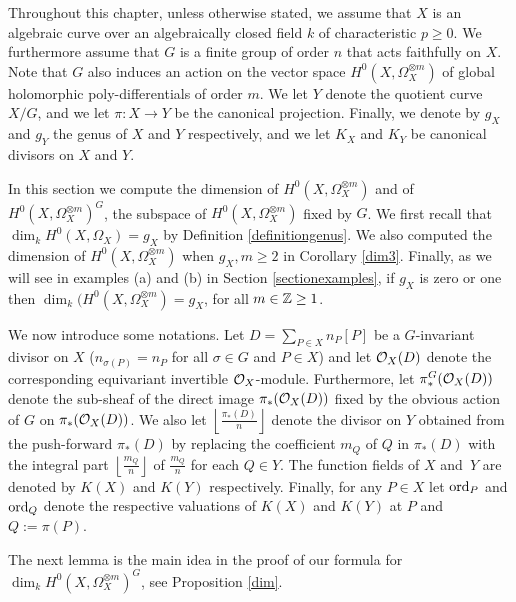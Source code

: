 Throughout this chapter, unless otherwise stated, we assume that $X$ is an algebraic curve over an algebraically closed field $k$ of characteristic $p \geq 0$.
We furthermore assume that $G$ is a finite group of order $n$ that acts faithfully on $X$.
Note that $G$ also induces an action on the vector space $H^0(X,\Omega_X^{\otimes m})$ of global holomorphic poly-differentials of order $m$.
We let $Y$ denote the quotient curve $X/G$, and we let $\pi\colon X\rightarrow Y$ be the canonical projection.
Finally, we denote by $g_X$ and $g_Y$ the genus of $X$ and $Y$ respectively, and we let $K_X$ and $K_Y$ be canonical divisors on $X$ and $Y$.


In this section we compute the dimension of $H^0(X,\Omega_X^{\otimes m})$ and of $H^0(X,\Omega_X^{\otimes m})^G$, the subspace of $H^0(X,\Omega_X^{\otimes m})$ fixed by $G$.
We first recall that $\dim_kH^0(X,\Omega_X)=g_X$ by Definition \ref{definitiongenus}.
We also computed the dimension of $H^0(X,\Omega_X^{\otimes m})$ when $g_X,m \geq 2$ in Corollary \ref{dim3}.
Finally, as we will see in examples (a) and (b) in Section \ref{sectionexamples}, if $g_X$ is zero or one then $\dim_k(H^0(X,\Omega_X^{\otimes m})= g_X$, for all $m \in {\mathbb Z}\geq 1$.


We now introduce some notations. 
Let $D=\sum_{P\in X}n_P[P]$ be a $G$-invariant divisor on $X$ (\ie $n_{\sigma(P)} = n_P$ for all $\sigma \in G$ and $P\in X$) and let ${\cal O}_X(D)$ denote the corresponding equivariant invertible ${\cal O}_X$-module. 
Furthermore, let $\pi_*^G({\cal O}_X(D))$ denote the sub-sheaf of the direct image $\pi_*({\cal O}_X(D))$ fixed by the obvious action of $G$ on $\pi_*({\cal O}_X(D))$.
We also let $\left\lfloor \frac{\pi_*(D)}{n} \right \rfloor$ denote the divisor on $Y$ obtained from the push-forward $\pi_*(D)$ by replacing the coefficient $m_Q$ of $Q$ in $\pi_*(D)$ with the integral part $\left \lfloor \frac{m_Q}{n} \right \rfloor$ of $\frac{m_Q}{n}$ for each $Q \in Y$. 
The function fields of $X$ and~$Y$ are denoted by $K(X)$ and $K(Y)$ respectively. 
Finally, for any $P \in X$ let $\operatorname{ord}_P$ and $\operatorname{ord}_Q$ denote the respective valuations of $K(X)$ and $K(Y)$ at $P$ and $Q:=\pi(P)$.

The next lemma is the main idea in the proof of our formula for $\dim_kH^0(X,\Omega_X^{\otimes m})^G$, see Proposition \ref{dim}. 

